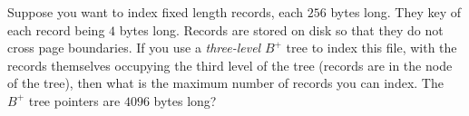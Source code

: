 



\question[4] Suppose you want to index fixed length records,
each $256$ bytes long. They key of each record being $4$ bytes
long. Records are stored on disk so that they do not cross
page boundaries. If you use a \textit{three-level} $B^{+}$ tree 
to index this file, with the records themselves occupying the 
third level of the tree (records are in the node of the tree), 
then what is the maximum number of records you can index. The 
$B^{+}$ tree pointers are $4096$ bytes long?

\begin{solution}[\fullpage]


\end{solution}


